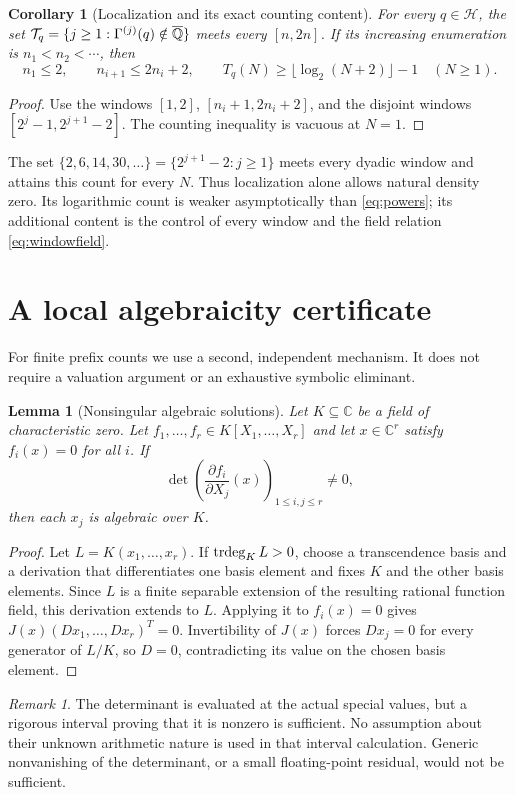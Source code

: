 \documentclass[11pt,a4paper]{article}
\newtheorem{lemma}[theorem]{Lemma}
\newtheorem{corollary}[theorem]{Corollary}
\theoremstyle{definition}\newtheorem{definition}[theorem]{Definition}
\theoremstyle{remark}\newtheorem{remark}[theorem]{Remark}
\newcommand{\C}{\mathbb C}\newcommand{\R}{\mathbb R}\newcommand{\Z}{\mathbb Z}
\begin{document}
\begin{corollary}[Localization and its exact counting content]\label{cor:dyadiccount}
For every $q\in\mathcal H$, the set $\mathcal T_q=\{j\ge1:\Gamma^{(j)}(q)\notin\overline{\mathbb Q}\}$ meets every $[n,2n]$. If its increasing enumeration is $n_1<n_2<\cdots$, then
\[
n_1\le2,\qquad n_{i+1}\le2n_i+2,\qquad
T_q(N)\ge\lfloor\log_2(N+2)\rfloor-1\quad(N\ge1).
\]
\end{corollary}
\begin{proof}
Use the windows $[1,2]$, $[n_i+1,2n_i+2]$, and the disjoint windows $[2^j-1,2^{j+1}-2]$. The counting inequality is vacuous at $N=1$.
\end{proof}
The set $\{2,6,14,30,\ldots\}=\{2^{j+1}-2:j\ge1\}$ meets every dyadic window and attains this count for every $N$. Thus localization alone allows natural density zero. Its logarithmic count is weaker asymptotically than \eqref{eq:powers}; its additional content is the control of every window and the field relation \eqref{eq:windowfield}.
\section{A local algebraicity certificate}\label{sec:jaclemma}
For finite prefix counts we use a second, independent mechanism. It does not require a valuation argument or an exhaustive symbolic eliminant.

\begin{lemma}[Nonsingular algebraic solutions]\label{lem:jac}
Let $K\subseteq\C$ be a field of characteristic zero. Let
$f_1,\ldots,f_r\in K[X_1,\ldots,X_r]$ and let $x\in\C^r$ satisfy $f_i(x)=0$ for all $i$. If
\[
\det\left(\frac{\partial f_i}{\partial X_j}(x)\right)_{1\le i,j\le r}\ne0,
\]
then each $x_j$ is algebraic over $K$.
\end{lemma}
\begin{proof}
Let $L=K(x_1,\ldots,x_r)$. If $\operatorname{trdeg}_KL>0$, choose a transcendence basis and a derivation that differentiates one basis element and fixes $K$ and the other basis elements. Since $L$ is a finite separable extension of the resulting rational function field, this derivation extends to $L$. Applying it to $f_i(x)=0$ gives
$J(x)(Dx_1,\ldots,Dx_r)^T=0$. Invertibility of $J(x)$ forces $Dx_j=0$ for every generator of $L/K$, so $D=0$, contradicting its value on the chosen basis element.
\end{proof}

\begin{remark}
The determinant is evaluated at the actual special values, but a rigorous interval proving that it is nonzero is sufficient. No assumption about their unknown arithmetic nature is used in that interval calculation. Generic nonvanishing of the determinant, or a small floating-point residual, would not be sufficient.
\end{remark}
\end{document}
